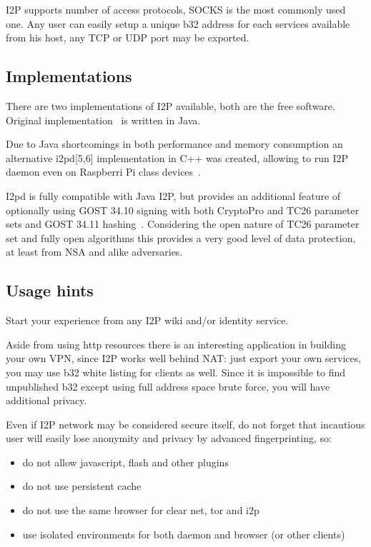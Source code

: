 \documentclass[10pt, a5paper]{article}
\begin{document}
I2P supports number of access protocols, SOCKS is the most \linebreak commonly used one. Any user can easily setup a unique b32 address for each services available from his host, any TCP or UDP port may be exported.

\subsection*{Implementations}

There are two implementations of I2P available, both are the free software. Original implementation~\cite{Savchenko-4} is written in Java.

Due to Java shortcomings in both performance and memory \linebreak consumption an alternative i2pd[5,6] implementation in C++ was \linebreak created, allowing to run I2P daemon even on Raspberri Pi class \linebreak devices~\cite{Savchenko-7}.

I2pd is fully compatible with Java I2P, but provides an additional feature of optionally using GOST 34.10 signing with both CryptoPro and TC26 parameter sets and GOST 34.11 hashing~\cite{Savchenko-8}. Considering the open nature of TC26 parameter set and fully open algorithms this provides a very good level of data protection, at least from NSA and alike adversaries.

\subsection*{Usage hints}

Start your experience from any I2P wiki and/or identity service.

Aside from using http resources there is an interesting application in building your own VPN, since I2P works well behind NAT: just export your own services, you may use b32 white listing for clients as well. Since it is impossible to find unpublished b32 except using full address space brute force, you will have additional privacy.

Even if I2P network may be considered secure itself, do not forget that incautious user will easily lose anonymity and privacy by advanced fingerprinting, so:

\begin{itemize}
  \item do not allow javascript, flash and other plugins
  \item do not use persistent cache
  \item do not use the same browser for clear net, tor and i2p
  \item use isolated environments for both daemon and browser (or other clients)
\end{itemize}
\end{document}
